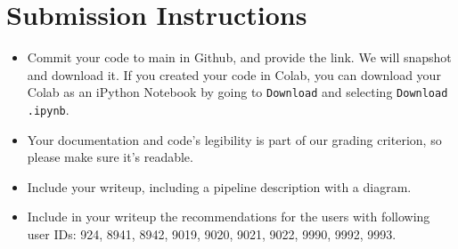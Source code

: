 \documentclass[paper=a4, fontsize=11pt]{scrartcl} %
\numberwithin{equation}{section} %
\numberwithin{figure}{section} %
\numberwithin{table}{section} %
\begin{document}
\section{Submission Instructions}

\begin{itemize}
    \item Commit your code to main in Github, and provide the link. We will snapshot and download it. If you created your code in Colab, you can download your Colab as an iPython Notebook by going to \verb"Download" and selecting \verb"Download .ipynb". 
    \item Your documentation and code's legibility is part of our grading criterion, so please make sure it's readable.
    \item Include your writeup, including a pipeline description with a diagram.
    \item Include in your writeup the recommendations for the users with following user IDs: 924, 8941, 8942, 9019, 9020, 9021, 9022, 9990, 9992, 9993.
\end{itemize}
\end{document}
